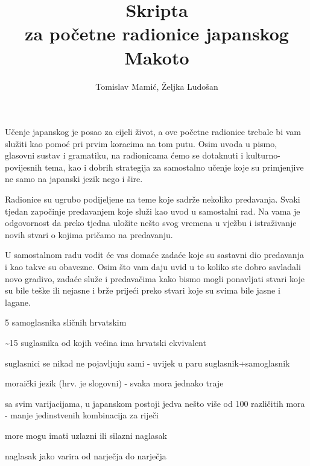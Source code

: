 
\usepackage{tikz}
\usepackage{xcolor}
\usepackage{wasysym}
\title{Skripta\\
\large za početne radionice japanskog\\
Makoto}
\author{Tomislav Mamić, Željka Ludošan}


{\let\cleardoublepage\clearpage
\maketitle
\tableofcontents}
\newpage
{}

	
	
	Učenje japanskog je posao za cijeli život, a ove početne radionice trebale bi vam služiti kao pomoć pri prvim koracima na tom putu. Osim uvoda u pismo, glasovni sustav i gramatiku, na radionicama ćemo se dotaknuti i kulturno-povijesnih tema, kao i dobrih strategija za samostalno učenje koje su primjenjive ne samo na japanski jezik nego i šire.
	
	
	Radionice su ugrubo podijeljene na teme koje sadrže nekoliko predavanja. Svaki tjedan započinje predavanjem koje služi kao uvod u samostalni rad. Na vama je odgovornost da preko tjedna uložite nešto svog vremena u vježbu i istraživanje novih stvari o kojima pričamo na predavanju.
	
	
	U samostalnom radu vodit će vas domaće zadaće koje su sastavni dio predavanja i kao takve su obavezne. Osim što vam daju uvid u to koliko ste dobro savladali novo gradivo, zadaće služe i predavačima kako bismo mogli ponavljati stvari koje su bile teške ili nejasne i brže prijeći preko stvari koje su svima bile jasne i lagane.
	
	
	\begin{hyou}
		\item 5 samoglasnika sličnih hrvatskim
		\item \textasciitilde15 suglasnika od kojih većina ima hrvatski ekvivalent
		\item suglasnici se nikad ne pojavljuju sami - uvijek u paru suglasnik+samoglasnik
		\item moraički jezik (hrv. je slogovni) - svaka mora jednako traje
		\item sa svim varijacijama, u japanskom postoji jedva nešto više od 100 različitih mora - manje jedinstvenih kombinacija za riječi
		\item more mogu imati uzlazni ili silazni naglasak
		\item naglasak jako varira od narječja do narječja
	\end{hyou}

